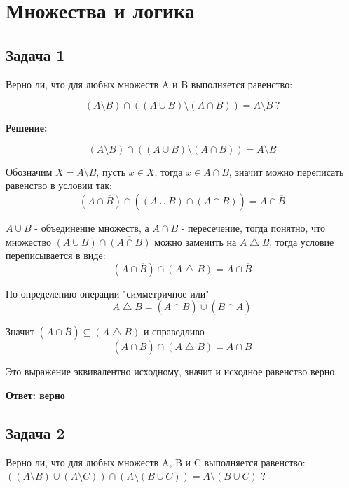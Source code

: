 \documentclass[a4paper,14pt]{article} %
\begin{document}
\section{Множества и логика}

\subsection{Задача 1}

 Верно ли, что для любых множеств A и B выполняется равенство:

\[(A\setminus B)\cap ((A\cup B)\setminus (A\cap B)) = A\setminus B\  ? \]
\begin{center}
\bfseries
{\Large Решение: }
\end{center}


\[(A\setminus B)\cap ((A\cup B)\setminus (A\cap B))= A\setminus B\]

Обозначим $X=A\setminus B$, пусть $x\in X$, тогда $x\in A\cap \overline{B}$, значит можно переписать равенство в условии так:
\[(A\cap \overline{B})\cap ((A\cup B)\cap \overline{(A\cap B)})= A\cap \overline{B}\]

$A\cup B$ - объединение множеств, а $A\cap B$ - пересечение, тогда понятно, что множество $(A\cup B)\cap \overline{(A\cap B)}$ можно заменить на $A\bigtriangleup B$, тогда условие переписывается в виде:
\[(A\cap \overline{B})\cap (A\bigtriangleup B)= A\cap \overline{B}\]

По определению операции "симметричное или"
\[A\bigtriangleup B = (A\cap \overline{B})\cup (B\cap \overline{A})\]

Значит $(A\cap \overline{B})\subseteq (A\bigtriangleup B)$ и справедливо
\[(A\cap \overline{B})\cap (A\bigtriangleup B)= A\cap \overline{B}\]

Это выражение эквивалентно исходному, значит и исходное равенство верно.

\begin{flushright}
\begin{large}
\textbf {Ответ: верно}
\end{large}
\end{flushright}

\newpage
\begin{center}
\subsection{Задача 2}
\end{center}

Верно ли, что для любых множеств A, B и C выполняется равенство: $((A \setminus B) \cup (A \setminus C)) \cap (A \setminus (B \cup C)) = A \setminus (B \cup C) $ ?
\end{document}
